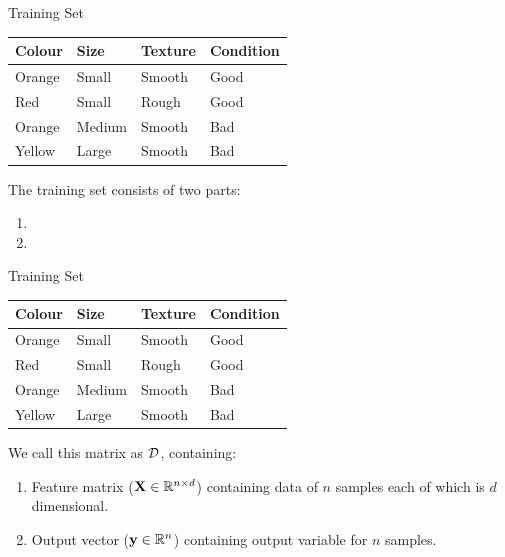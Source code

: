 \documentclass[usenames,dvipsnames]{beamer}
\begin{document}
\begin{frame}{Training Set}

\begin{table}[]
	\begin{tabular}{|l|l|l||l|}
		\hline 
				\rowcolor{white}
		\textbf{Colour} & \textbf{Size} & \textbf{Texture} & \textbf{Condition} \\ \hline 
		Orange & Small & Smooth  & Good      \\
		Red    & Small  & Rough  & Good \\
		Orange & Medium & Smooth & Bad \\
		Yellow & Large  & Smooth & Bad \\ \hline 
		
	\end{tabular}
\end{table}

\pause The training set consists of two parts:
\begin{enumerate}
	\item \pause \color{Lavender}{Features (Input Variables)}
	\item \pause \color{Tan}{Output or Response Variable}
\end{enumerate}
\end{frame}

\begin{frame}{Training Set}
\vspace{-5pt}
\begin{table}[]
	\begin{tabular}{|l|l|l||l|}
		\hline 
		\rowcolor{white}
		\textbf{Colour} & \textbf{Size} & \textbf{Texture} & \textbf{Condition} \\ \hline 
		Orange & Small & Smooth  & Good      \\
		Red    & Small  & Rough  & Good \\
		Orange & Medium & Smooth & Bad \\
		Yellow & Large  & Smooth & Bad \\ \hline 
		
	\end{tabular}
\end{table}


\pause We call this matrix as $\mathcal{D}$, containing:
\begin{enumerate}
	\item Feature matrix ($\mathbf{X} \in \mathbb{R}^{n \times d}$) containing data of $n$ samples each of which is $d$ dimensional.
	\item Output vector ($\mathbf{y} \in \mathbb{R}^n$) containing output variable for $n$ samples.
\end{enumerate}

\end{frame}
\end{document}
